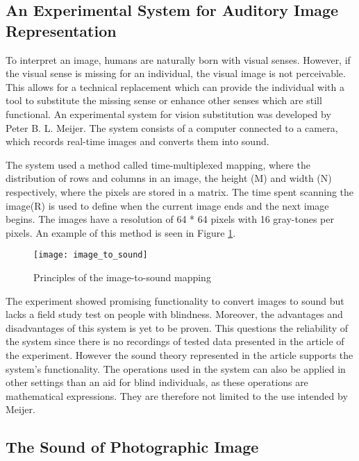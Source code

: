  
\subsection{An Experimental System for Auditory Image Representation}\label{sec:experimentalsystem}

To interpret an image, humans are naturally born with visual senses. However, if the visual sense is missing for an individual, the visual image is not perceivable. This allows for a technical replacement which can provide the individual with a tool to substitute the missing sense or enhance other senses which are still functional. An experimental system for vision substitution was developed by Peter B. L. Meijer\cite{Meijer1992}. The system consists of a computer connected to a camera, which records real-time images and converts them into sound. 

The system used a method called time-multiplexed mapping, where the distribution of rows and columns in an image, the height (M) and width (N) respectively, where the pixels are stored in a matrix. The time spent scanning the image(R) is used to define when the current image ends and the next image begins. The images have a resolution of 64 * 64 pixels with 16 gray-tones per pixels. An example of this method is seen in Figure \ref{fig:image_to_sound}. 

\begin{figure}[!h] 
\centering
\texttt{[image: image\_to\_sound]}
\caption{\label{fig:image_to_sound} Principles of the image-to-sound mapping \cite{Meijer1992}}
\end{figure}
  
The experiment showed promising functionality to convert images to sound but lacks a field study test on people with blindness. Moreover, the advantages and disadvantages of this system is yet to be proven. This questions the reliability of the system since there is no recordings of tested data presented in the article of the experiment. However the sound theory represented in the article supports the system's functionality. The operations used in the system can also be applied in other settings than an aid for blind individuals,  as these operations are mathematical expressions. They are therefore not limited to the use intended by Meijer.

\subsection{The Sound of Photographic Image}\label{sec:soundarticle}

